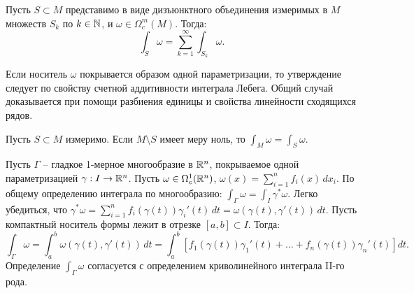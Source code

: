 \begin{lemma}
    Пусть $S \subset M$ представимо в виде дизъюнктного объединения измеримых в $M$ множеств $S_k$ по $k \in \mathbb{N}$, и $\omega \in \Omega_c^m(M)$. Тогда:
    \[
    \int_S \omega = \sum_{k=1}^\infty \int_{S_k} \omega.
    \]
\end{lemma}

\begin{myproof}
    Если носитель $\omega$ покрывается образом одной параметризации, то утверждение следует по свойству счетной аддитивности интеграла Лебега. Общий случай доказывается при помощи разбиения единицы и свойства линейности сходящихся рядов.
\end{myproof}

\begin{corollary}
    Пусть $S \subset M$ измеримо. Если $M \setminus S$ имеет меру ноль, то $\int_M \omega = \int_S \omega$.
\end{corollary}


\begin{example}
    Пусть $\Gamma$ -- гладкое 1-мерное многообразие в $\mathbb{R}^n$, покрываемое одной параметризацией $\gamma: I \to \mathbb{R}^n$. Пусть $\omega \in \Omega_c^1(\mathbb{R}^n)$, $\omega(x) = \sum_{i=1}^n f_i(x)\, dx_i$.
    По общему определению интеграла по многообразию: $\int_\Gamma \omega = \int_I \gamma^*\omega$. 
    Легко убедиться, что $\gamma^*\omega = \sum_{i=1}^n f_i(\gamma(t)) \gamma_i'(t)\, dt = \omega(\gamma(t), \gamma'(t))\, dt.$
    Пусть компактный носитель формы лежит в отрезке $[a, b] \subset I$. Тогда:
    \[
    \int_\Gamma \omega = \int_a^b \omega(\gamma(t), \gamma'(t))\, dt = \int_a^b \left[ f_1(\gamma(t))\gamma_1'(t) + \dotsc + f_n(\gamma(t))\gamma_n'(t) \right] dt.
    \]
	Определение $\int_{\Gamma} \omega$ согласуется с определением криволинейного интеграла II-го рода.
\end{example}

